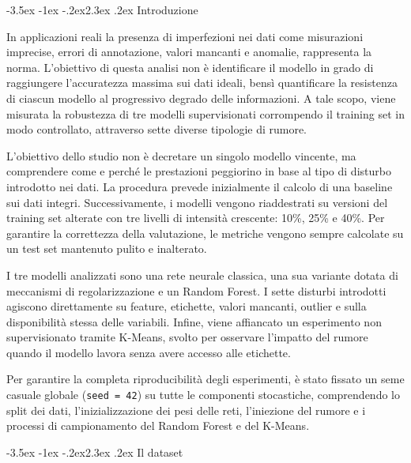 \documentclass[12pt,a4paper]{article}
\makeatletter
\renewcommand\section{\@startsection{section}{1}{\z@}%
  {-3.5ex \@plus -1ex \@minus -.2ex}{2.3ex \@plus.2ex}%
  {\normalfont\Large\bfseries}}
\makeatother
\begin{document}
\section{Introduzione}\label{sec:intro}

In applicazioni reali la presenza di imperfezioni nei dati come
misurazioni imprecise, errori di annotazione, valori mancanti e anomalie,
rappresenta la norma. L'obiettivo di questa analisi non è identificare il 
modello in grado di raggiungere l'accuratezza massima sui dati ideali, bensì 
quantificare la resistenza di ciascun modello al progressivo degrado delle 
informazioni. A tale scopo, viene misurata la robustezza di tre modelli 
supervisionati corrompendo il training set in modo controllato, attraverso 
sette diverse tipologie di rumore.

L'obiettivo dello studio non è decretare un singolo modello vincente, ma
comprendere come e perché le prestazioni peggiorino in base al tipo di
disturbo introdotto nei dati. La procedura prevede inizialmente il
calcolo di una baseline sui dati integri. Successivamente,
i modelli vengono riaddestrati su versioni del training set
alterate con tre livelli di intensità crescente: 10\%, 25\% e 40\%.
Per garantire la correttezza della valutazione, le metriche vengono
sempre calcolate su un test set mantenuto pulito e inalterato.

I tre modelli analizzati sono una rete neurale classica,
una sua variante dotata di meccanismi di regolarizzazione
e un Random Forest. I sette disturbi introdotti agiscono
direttamente su feature, etichette, valori mancanti,
outlier e sulla disponibilità stessa delle variabili. Infine,
viene affiancato un esperimento non supervisionato tramite K-Means,
svolto per osservare l'impatto del rumore quando il modello lavora
senza avere accesso alle etichette.

Per garantire la completa riproducibilità degli esperimenti, è stato fissato un 
seme casuale globale (\texttt{seed = 42}) su tutte le componenti stocastiche, 
comprendendo lo split dei dati, l'inizializzazione dei pesi delle reti, 
l'iniezione del rumore e i processi di campionamento del Random Forest e del 
K-Means.

\section{Il dataset}\label{sec:dataset}
\end{document}
